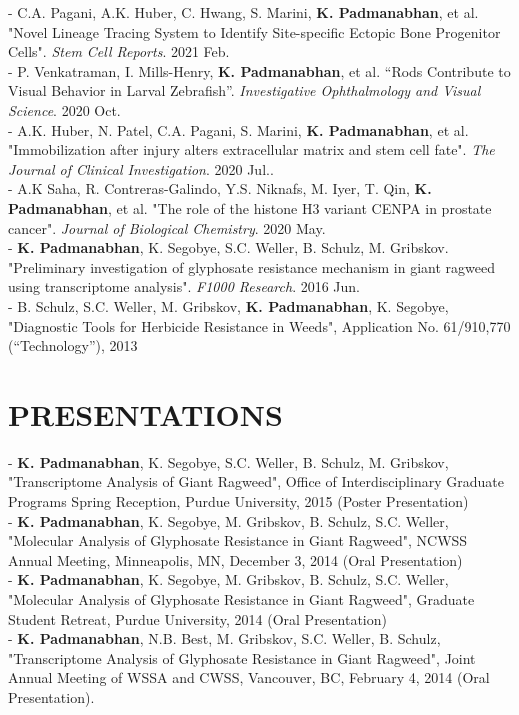 \documentclass[11pt,letterpaper,sans]{moderncv}        %
\begin{document}
{\begin{minipage}{\maincolumnwidth}
{	- C.A. Pagani, A.K. Huber, C. Hwang, S. Marini, \textbf{K. Padmanabhan}, et al. "Novel Lineage Tracing System to Identify Site-specific Ectopic Bone Progenitor Cells". \textit{Stem Cell Reports}. 2021 Feb.\\
          - P. Venkatraman, I. Mills-Henry, \textbf{K. Padmanabhan}, et al. “Rods Contribute to Visual Behavior in Larval Zebrafish”. \textit{Investigative Ophthalmology and Visual Science}. 2020 Oct.\\
	- A.K. Huber, N. Patel, C.A. Pagani, S. Marini, \textbf{K. Padmanabhan}, et al. "Immobilization after injury alters extracellular matrix and stem cell fate". \textit{The Journal of Clinical Investigation}. 2020 Jul..\\
          - A.K Saha, R. Contreras-Galindo, Y.S. Niknafs, M. Iyer, T. Qin, \textbf{K. Padmanabhan}, et al. "The role of the histone H3 variant CENPA in prostate cancer". \textit{Journal of Biological Chemistry}. 2020 May.\\
	- \textbf{K. Padmanabhan}, K. Segobye, S.C. Weller, B. Schulz, M. Gribskov. "Preliminary investigation of glyphosate resistance mechanism in giant ragweed using transcriptome analysis". \textit{F1000 Research}. 2016 Jun.\\
	- B. Schulz, S.C. Weller, M. Gribskov, \textbf{K. Padmanabhan}, K. Segobye, "Diagnostic Tools for Herbicide Resistance in Weeds", Application No. 61/910,770 (“Technology”), 2013
	}%
\end{minipage}%


\section{PRESENTATIONS}
\begin{minipage}{\maincolumnwidth}%
	\small{
	- \textbf{K. Padmanabhan}, K. Segobye, S.C. Weller, B. Schulz, M. Gribskov, "Transcriptome Analysis of Giant Ragweed", Office of Interdisciplinary Graduate Programs Spring Reception, Purdue University, 2015 (Poster Presentation)\\
	- \textbf{K. Padmanabhan}, K. Segobye, M. Gribskov, B. Schulz, S.C. Weller, "Molecular Analysis of Glyphosate Resistance in Giant Ragweed", NCWSS Annual Meeting, Minneapolis, MN, December 3, 2014 (Oral Presentation)\\
	- \textbf{K. Padmanabhan}, K. Segobye, M. Gribskov, B. Schulz, S.C. Weller, "Molecular Analysis of Glyphosate Resistance in Giant Ragweed", Graduate Student Retreat, Purdue University, 2014 (Oral Presentation)\\
          - \textbf{K. Padmanabhan}, N.B. Best, M. Gribskov, S.C. Weller, B. Schulz, "Transcriptome Analysis of Glyphosate Resistance in Giant Ragweed", Joint Annual Meeting of WSSA and CWSS, Vancouver, BC, February 4, 2014 (Oral Presentation).  
	}%
\end{minipage}%

}
\end{document}
